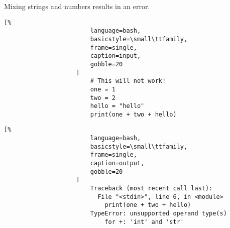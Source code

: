 \documentclass[crop=false,class=book,oneside]{standalone}
\begin{document}
                Mixing strings and numbers results in
                an error.\newline
                \begin{minipage}[t]{.48\textwidth}
                    \centering
                    \begin{lstlisting}[%
                        language=bash,
                        basicstyle=\small\ttfamily,
                        frame=single,
                        caption=input,
                        gobble=20
                    ]
                        # This will not work!
                        one = 1
                        two = 2
                        hello = "hello"
                        print(one + two + hello)
                    \end{lstlisting}
                \end{minipage}\hfill
                \begin{minipage}[t]{.48\textwidth}
                    \centering
                    \begin{lstlisting}[%
                        language=bash,
                        basicstyle=\small\ttfamily,
                        frame=single,
                        caption=output,
                        gobble=20
                    ]
                        Traceback (most recent call last):
                          File "<stdin>", line 6, in <module>
                            print(one + two + hello)
                        TypeError: unsupported operand type(s)
                            for +: 'int' and 'str'
                    \end{lstlisting}
                \end{minipage}
\end{document}
